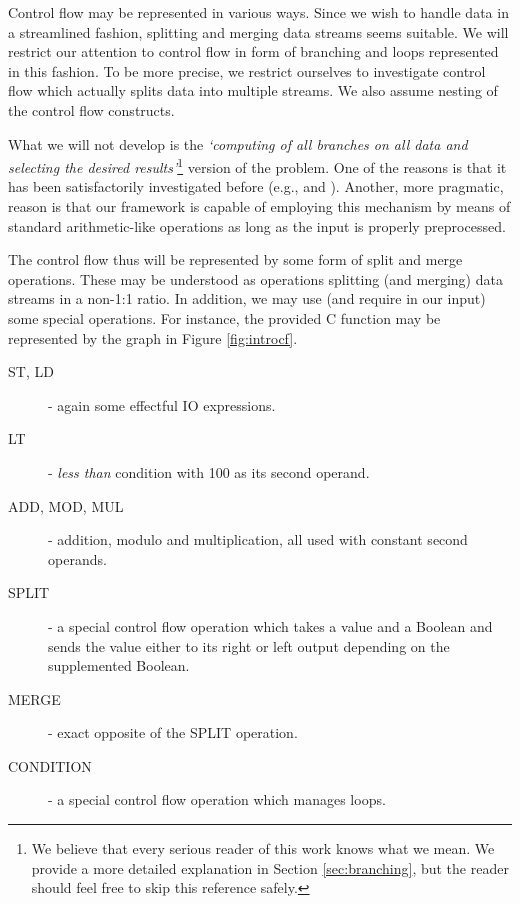 Control flow may be represented in various ways. Since we wish to handle data in a streamlined fashion, splitting and merging data streams seems suitable. We will restrict our attention to control flow in form of branching and loops represented in this fashion. To be more precise, we restrict ourselves to investigate control flow which actually splits data into multiple streams. We also assume nesting of the control flow constructs.

\begin{rem}
  What we will not develop is the \emph{`computing of all branches on all data and selecting the desired results'}\footnote{We believe that every serious reader of this work knows what we mean. We provide a more detailed explanation in Section \ref{sec:branching}, but the reader should feel free to skip this reference safely.} version of the problem. One of the reasons is that it has been satisfactorily investigated before (e.g., \cite{select} and \cite{select2}). Another, more pragmatic, reason is that our framework is capable of employing this mechanism by means of standard arithmetic-like operations as long as the input is properly preprocessed.
\end{rem}


The control flow thus will be represented by some form of split and merge operations. These may be understood as operations splitting (and merging) data streams in a non-1:1 ratio. In addition, we may use (and require in our input) some special operations. For instance, the provided C function may be represented by the graph in Figure \ref{fig:introcf}.


\begin{description}
  \item[ST, LD] - again some effectful IO expressions.
  \item[LT] - \emph{less than} condition with 100 as its second operand.
  \item[ADD, MOD, MUL] - addition, modulo and multiplication, all used with constant second operands.
  \item[SPLIT] - a special control flow operation which takes a value and a Boolean and sends the value either to its right or left output depending on the supplemented Boolean.
  \item[MERGE] - exact opposite of the SPLIT operation.
  \item[CONDITION] - a special control flow operation which manages loops.
\end{description}


